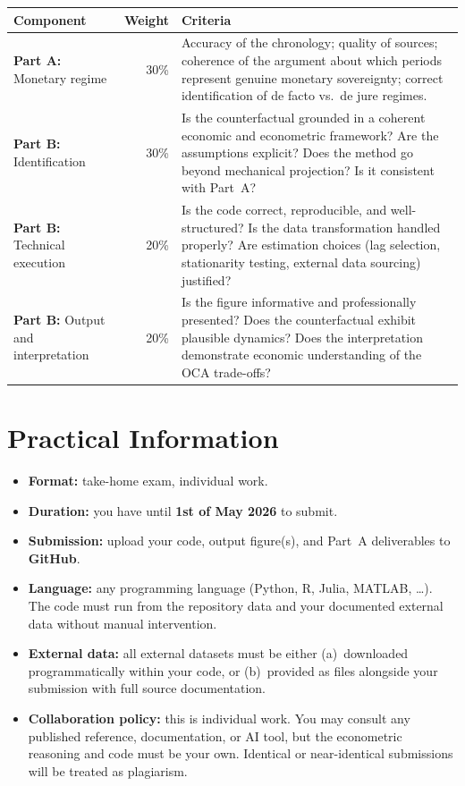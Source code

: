 \documentclass[11pt,a4paper]{article}
\begin{document}
\begin{center}
\small
\begin{tabularx}{\textwidth}{lrX}
\toprule
\textbf{Component} & \textbf{Weight} & \textbf{Criteria} \\
\midrule
\textbf{Part A:} Monetary regime & 30\% &
  Accuracy of the chronology; quality of sources; coherence of the argument
  about which periods represent genuine monetary sovereignty; correct
  identification of de facto vs.\ de jure regimes. \\[0.8em]
\textbf{Part B:} Identification & 30\% &
  Is the counterfactual grounded in a coherent economic and econometric
  framework? Are the assumptions explicit? Does the method go beyond mechanical
  projection? Is it consistent with Part~A? \\[0.8em]
\textbf{Part B:} Technical execution & 20\% &
  Is the code correct, reproducible, and well-structured? Is the data
  transformation handled properly? Are estimation choices (lag selection,
  stationarity testing, external data sourcing) justified? \\[0.8em]
\textbf{Part B:} Output and interpretation & 20\% &
  Is the figure informative and professionally presented? Does the
  counterfactual exhibit plausible dynamics? Does the interpretation demonstrate
  economic understanding of the OCA trade-offs? \\
\bottomrule
\end{tabularx}
\end{center}


\section*{Practical Information}

\begin{itemize}[leftmargin=2em]
  \item \textbf{Format:} take-home exam, individual work.
  \item \textbf{Duration:} you have until \textbf{1st of May 2026} to submit.
  \item \textbf{Submission:} upload your code, output figure(s), and Part~A
    deliverables to \textbf{GitHub}.
  \item \textbf{Language:} any programming language (Python, R, Julia,
    MATLAB, \ldots). The code must run from the repository data and your
    documented external data without manual intervention.
  \item \textbf{External data:} all external datasets must be either
    (a)~downloaded programmatically within your code, or (b)~provided as files
    alongside your submission with full source documentation.
  \item \textbf{Collaboration policy:} this is individual work. You may
    consult any published reference, documentation, or AI tool, but the
    econometric reasoning and code must be your own. Identical or
    near-identical submissions will be treated as plagiarism.
\end{itemize}
\end{document}
